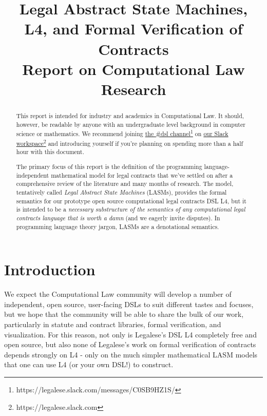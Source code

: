 \documentclass[12pt]{article}
\title{Legal Abstract State Machines, \\
L4, and Formal Verification of Contracts \\
\smaller \smaller Report on Computational Law Research \larger \larger }
\newcommand{\lasm}{{\sf LASM}\xspace}
\newcommand{\lasms}{{\sf LASM}s\xspace}
\begin{document}
\maketitle

\begin{abstract}
This report is intended for industry and academics in Computational Law. It should, however, be readable by anyone with an undergraduate level background in computer science or mathematics. We recommend joining \href{https://legalese.slack.com/messages/C0SB9HZ1S/}{the \#dsl channel}\footnote{https://legalese.slack.com/messages/C0SB9HZ1S/} on \href{https://legalese.slack.com}{our Slack workspace}\footnote{https://legalese.slack.com} and introducing yourself if you're planning on spending more than a half hour with this document. %

The primary focus of this report is the definition of the programming language-independent mathematical model for legal contracts that we've settled on after a comprehensive review of the literature and many months of research. The model, tentatively called \textit{Legal Abstract State Machines} (\lasms), provides the formal semantics for our prototype open source computational legal contracts DSL L4, but it is intended to be a \textit{necessary substructure of the semantics of any computational legal contracts language that is worth a damn} (and we eagerly invite disputes). In programming language theory jargon, \lasms are a denotational semantics.
\end{abstract}

\pagebreak

\tableofcontents


\section{Introduction}

We expect the Computational Law community will develop a number of independent, open source, user-facing DSLs to suit different tastes and focuses, but we hope that the community will be able to share the bulk of our work, particularly in statute and contract libraries, formal verification, and visualization. For this reason, not only is Legalese's DSL L4 completely free and open source, but also none of Legalese's work on formal verification of contracts depends strongly on L4 - only on the much simpler mathematical \lasm models that one can use L4 (or your own DSL!) to construct.
\end{document}
